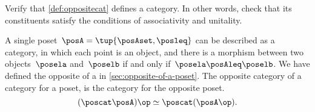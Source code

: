 \vfill
\begin{gradedexercise}
    \label{ex:OppositeCat}
    Verify that \cref{def:oppositecat} defines a category.
    In other words, check that its constituents satisfy the conditions of associativity and unitality.
\end{gradedexercise}



\begin{example}
    A single poset~$\posA=\tup{\posAset, \posleq}$ can be described as a category, in which each point is an object, and there is a morphism between two objects~$\posela$ and~$\poselb$ if and only if~$\posela \posAleq \poselb$.
    We have defined the opposite of a  in \cref{sec:opposite-of-a-poset}.
    The opposite category of a category for a poset, is the category for the opposite poset.
    \begin{equation}
        (\poscat \posA)\op \simeq \poscat (\posA\op) .
    \end{equation}
\end{example}
